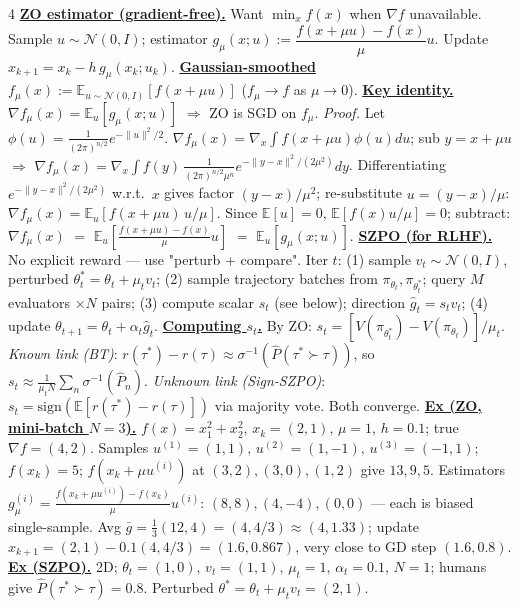 \documentclass[10pt,landscape,letterpaper]{article}
\let\oldtextbf\textbf
\renewcommand{\textbf}[1]{\uline{\oldtextbf{#1}}}
\begin{document}
\begin{multicols*}{4}
\textbf{ZO estimator (gradient-free).} Want \(\min_x f(x)\) when \(\nabla f\) unavailable.
Sample \(u{\sim}\mathcal N(0,I)\); estimator \(g_\mu(x;u){:=}\dfrac{f(x+\mu u)-f(x)}{\mu}u\). Update \(x_{k+1}=x_k-h\,g_\mu(x_k;u_k)\).
\textbf{Gaussian-smoothed} \(f_\mu(x){:=}\mathbb E_{u\sim\mathcal N(0,I)}[f(x+\mu u)]\) (\(f_\mu{\to}f\) as \(\mu{\to}0\)).
\textbf{Key identity.} \(\nabla f_\mu(x)=\mathbb E_u[g_\mu(x;u)]\) \(\Rightarrow\) ZO is SGD on \(f_\mu\).
\emph{Proof.} Let \(\phi(u){=}\tfrac{1}{(2\pi)^{n/2}}e^{-\|u\|^2/2}\). \(\nabla f_\mu(x)=\nabla_x\!\int\!f(x{+}\mu u)\phi(u)du\); sub \(y{=}x{+}\mu u\) \(\Rightarrow\) \(\nabla f_\mu(x)=\nabla_x\!\int\!f(y)\,\tfrac{1}{(2\pi)^{n/2}\mu^n}e^{-\|y-x\|^2/(2\mu^2)}dy\).
Differentiating \(e^{-\|y-x\|^2/(2\mu^2)}\) w.r.t.\ \(x\) gives factor \((y{-}x)/\mu^2\); re-substitute \(u{=}(y{-}x)/\mu\): \(\nabla f_\mu(x)=\mathbb E_u[f(x{+}\mu u)\,u/\mu]\).
Since \(\mathbb E[u]{=}0\), \(\mathbb E[f(x)u/\mu]{=}0\); subtract: \(\nabla f_\mu(x)\) \(=\) \(\mathbb E_u[\tfrac{f(x+\mu u)-f(x)}{\mu}u]\) \(=\) \(\mathbb E_u[g_\mu(x;u)]\).
\textbf{SZPO (for RLHF).} No explicit reward — use "perturb + compare". Iter \(t\):
(1) sample \(v_t\!\sim\!\mathcal N(0,I)\), perturbed \(\theta^*_t=\theta_t+\mu_t v_t\);
(2) sample trajectory batches from \(\pi_{\theta_t},\pi_{\theta^*_t}\); query \(M\) evaluators \(\times N\) pairs;
(3) compute scalar \(s_t\) (see below); direction \(\hat g_t=s_t v_t\);
(4) update \(\theta_{t+1}=\theta_t+\alpha_t\hat g_t\).
\textbf{Computing \(s_t\).} By ZO: \(s_t=[V(\pi_{\theta^*_t})-V(\pi_{\theta_t})]/\mu_t\).
\emph{Known link (BT)}: \(r(\tau^*){-}r(\tau)\approx\sigma^{-1}(\hat P(\tau^*\!\succ\!\tau))\), so \(s_t\approx\tfrac{1}{\mu_t N}\!\sum_n\!\sigma^{-1}(\hat P_n)\).
\emph{Unknown link (Sign-SZPO)}: \(s_t=\mathrm{sign}(\mathbb E[r(\tau^*){-}r(\tau)])\) via majority vote. Both converge.
\textbf{Ex (ZO, mini-batch \(N{=}3\)).} \(f(x){=}x_1^2{+}x_2^2,\,x_k{=}(2,1),\,\mu{=}1,\,h{=}0.1\); true \(\nabla f{=}(4,2)\).
Samples \(u^{(1)}{=}(1,1),\,u^{(2)}{=}(1,{-}1),\,u^{(3)}{=}({-}1,1)\); \(f(x_k){=}5\); \(f(x_k{+}\mu u^{(i)})\) at \((3,2),(3,0),(1,2)\) give \(13,9,5\).
Estimators \(g_\mu^{(i)}{=}\tfrac{f(x_k+\mu u^{(i)})-f(x_k)}{\mu}u^{(i)}\): \((8,8),(4,{-}4),(0,0)\) — each is biased single-sample.
Avg \(\bar g{=}\tfrac{1}{3}(12,4){=}(4,4/3)\approx(4,1.33)\); update \(x_{k+1}{=}(2,1){-}0.1(4,4/3){=}(\mathbf{1.6,0.867})\), very close to GD step \((1.6,0.8)\).
\textbf{Ex (SZPO).} 2D; \(\theta_t{=}(1,0),\,v_t{=}(1,1),\,\mu_t{=}1,\,\alpha_t{=}0.1,\,N{=}1\); humans give \(\hat P(\tau^*{\succ}\tau){=}0.8\). Perturbed \(\theta^*{=}\theta_t{+}\mu_t v_t{=}(2,1)\).

\end{multicols*}
\end{document}
